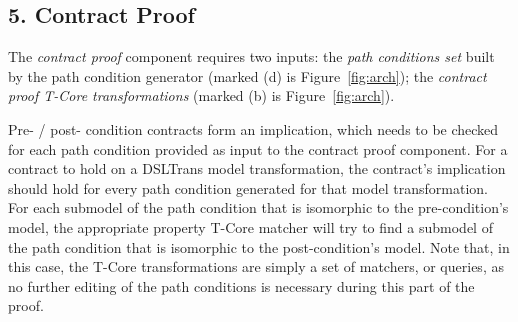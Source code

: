 
 
\subsection*{5. Contract Proof}

The \emph{contract proof} component requires two inputs: the \emph{path
conditions set} built by the path condition generator (marked (d) is Figure~\ref{fig:arch}); the \emph{contract
proof T-Core transformations} (marked (b) is Figure~\ref{fig:arch}).

Pre- / post- condition contracts form an implication, which needs to be
checked for each path condition provided as input to the contract proof
component. For a contract to hold on a DSLTrans model transformation, the
contract's implication should hold for every path condition generated for
that model transformation. For each submodel of the path condition that is isomorphic to the pre-condition's model, the appropriate property T-Core matcher will try to find a submodel of the path condition that is isomorphic to the post-condition's model.
 Note that, in this case, the T-Core transformations are simply a set of matchers, or queries, as no further
editing of the path conditions is necessary during this part of the proof.



